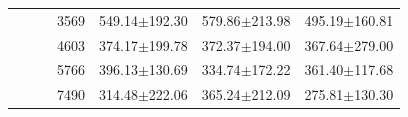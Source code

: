 \begin{table}[t]
\begin{tabular}{ccccccc}
                                    &                       &                                 & 3569        & 549.14$\pm$192.30                                                              & 579.86$\pm$213.98                                                          & 495.19$\pm$160.81                                                          \\
                                    &                       &                                 & 4603        & 374.17$\pm$199.78                                                              & 372.37$\pm$194.00                                                          & 367.64$\pm$279.00                                                          \\
                                    &                       &                                 & 5766        & 396.13$\pm$130.69                                                              & 334.74$\pm$172.22                                                          & 361.40$\pm$117.68                                                          \\
                                    &                       &                                 & 7490        & 314.48$\pm$222.06                                                              & 365.24$\pm$212.09                                                          & 275.81$\pm$130.30                                                          \\
        \bottomrule
    \end{tabular}
\end{table}



